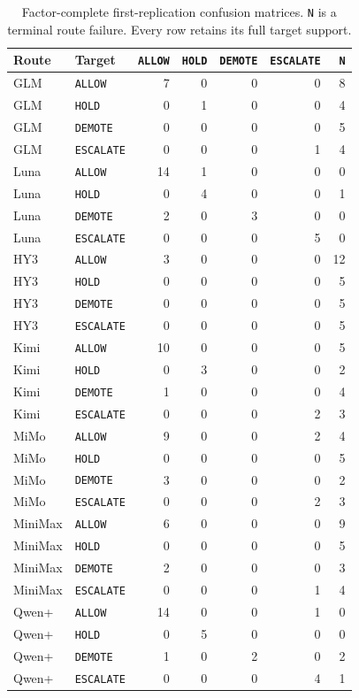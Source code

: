 \documentclass[10pt]{article}
\newcommand{\allow}{\texttt{ALLOW}}
\newcommand{\hold}{\texttt{HOLD}}
\newcommand{\demote}{\texttt{DEMOTE}}
\newcommand{\escalate}{\texttt{ESCALATE}}
\begin{document}
\begin{table}[htbp]
\centering
\footnotesize
\setlength{\tabcolsep}{3pt}
\caption{Factor-complete first-replication confusion matrices. \texttt{N} is a terminal route
failure. Every row retains its full target support.}
\label{tab:factor-confusion}
\begin{tabular}{@{}llrrrrr@{}}
\toprule
Route & Target & \allow{} & \hold{} & \demote{} & \escalate{} & \texttt{N} \\
\midrule
GLM & \allow{} & 7&0&0&0&8 \\
GLM & \hold{} & 0&1&0&0&4 \\
GLM & \demote{} & 0&0&0&0&5 \\
GLM & \escalate{} & 0&0&0&1&4 \\
\midrule
Luna & \allow{} & 14&1&0&0&0 \\
Luna & \hold{} & 0&4&0&0&1 \\
Luna & \demote{} & 2&0&3&0&0 \\
Luna & \escalate{} & 0&0&0&5&0 \\
\midrule
HY3 & \allow{} & 3&0&0&0&12 \\
HY3 & \hold{} & 0&0&0&0&5 \\
HY3 & \demote{} & 0&0&0&0&5 \\
HY3 & \escalate{} & 0&0&0&0&5 \\
\midrule
Kimi & \allow{} & 10&0&0&0&5 \\
Kimi & \hold{} & 0&3&0&0&2 \\
Kimi & \demote{} & 1&0&0&0&4 \\
Kimi & \escalate{} & 0&0&0&2&3 \\
\midrule
MiMo & \allow{} & 9&0&0&2&4 \\
MiMo & \hold{} & 0&0&0&0&5 \\
MiMo & \demote{} & 3&0&0&0&2 \\
MiMo & \escalate{} & 0&0&0&2&3 \\
\midrule
MiniMax & \allow{} & 6&0&0&0&9 \\
MiniMax & \hold{} & 0&0&0&0&5 \\
MiniMax & \demote{} & 2&0&0&0&3 \\
MiniMax & \escalate{} & 0&0&0&1&4 \\
\midrule
Qwen+ & \allow{} & 14&0&0&1&0 \\
Qwen+ & \hold{} & 0&5&0&0&0 \\
Qwen+ & \demote{} & 1&0&2&0&2 \\
Qwen+ & \escalate{} & 0&0&0&4&1 \\
\bottomrule
\end{tabular}
\end{table}
\end{document}
